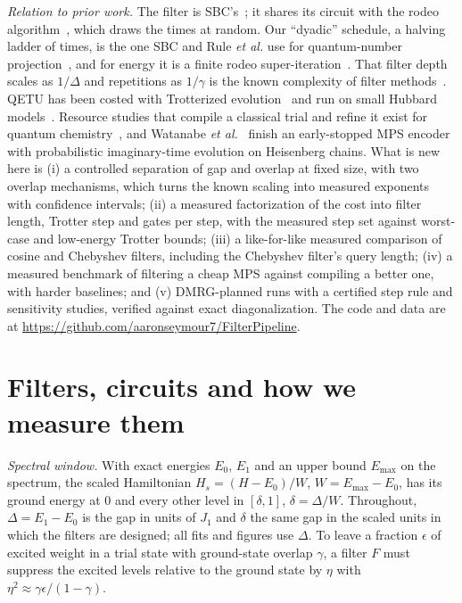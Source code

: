 \documentclass[aps,pra,twocolumn,superscriptaddress,nofootinbib]{revtex4-2}
\begin{document}
\emph{Relation to prior work.} The filter is SBC's~\cite{Stetcu2023}; it shares its circuit with the rodeo
algorithm~\cite{Choi2021,Qian2021}, which draws the times at random. Our ``dyadic'' schedule, a halving ladder of
times, is the one SBC and Rule \emph{et al.} use for quantum-number projection~\cite{Stetcu2023,Rule2024}, and for
energy it is a finite rodeo super-iteration~\cite{CohenOh2023,Patkowski2026}. That filter depth scales as $1/\Delta$
and repetitions as $1/\gamma$ is the known complexity of filter methods~\cite{Ge2019,Lin2020}. QETU has been costed
with Trotterized evolution~\cite{Kane2023} and run on small Hubbard models~\cite{Muller2024,Karacan2024}. Resource
studies that compile a classical trial and refine it exist for quantum chemistry~\cite{Fomichev2024,Berry2025,Lee2025},
and Watanabe \emph{et al.}~\cite{Watanabe2026} finish an early-stopped MPS encoder with probabilistic imaginary-time
evolution on Heisenberg chains. What is new here is (i) a controlled separation of gap and overlap at fixed size, with two overlap mechanisms,
which turns the known scaling into measured exponents with confidence intervals; (ii) a measured factorization of the
cost into filter length, Trotter step and gates per step, with the measured step set against worst-case and
low-energy Trotter bounds; (iii) a like-for-like measured comparison of cosine and Chebyshev filters, including the
Chebyshev filter's query length; (iv) a measured benchmark of filtering a cheap MPS against compiling a better one,
with harder baselines; and (v) DMRG-planned runs with a certified step rule and sensitivity studies, verified against
exact diagonalization. The code and data are at \url{https://github.com/aaronseymour7/FilterPipeline}.

\section{Filters, circuits and how we measure them}
\label{sec:pipeline}

\emph{Spectral window.} With exact energies $E_0$, $E_1$ and an upper bound $E_{\max}$ on the spectrum, the scaled
Hamiltonian $H_s=(H-E_0)/W$, $W=E_{\max}-E_0$, has its ground energy at 0 and every other level in $[\delta,1]$,
$\delta=\Delta/W$. Throughout, $\Delta=E_1-E_0$ is the gap in units of $J_1$ and $\delta$ the same gap in the scaled
units in which the filters are designed; all fits and figures use $\Delta$. To leave a fraction $\epsilon$ of excited weight in a trial state with ground-state overlap
$\gamma$, a filter $F$ must suppress the excited levels relative to the ground state by $\eta$ with
$\eta^2\approx\gamma\epsilon/(1-\gamma)$.
\end{document}

